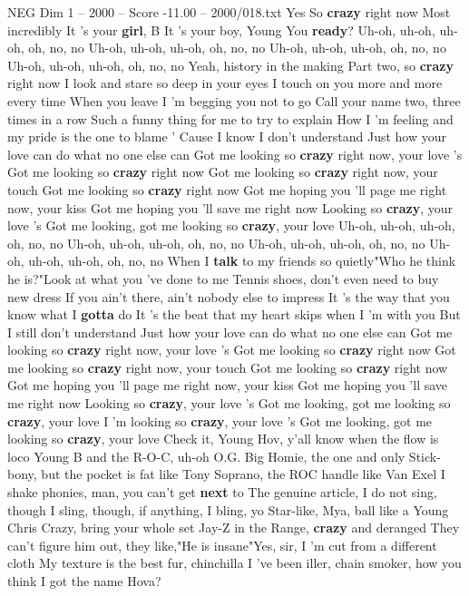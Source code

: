 \begin{textsample}{NEG Dim 1 – 2000 – Score -11.00 – 2000/018.txt}  \label{ex:f1_neg_003}
Yes So \textbf{crazy} right now Most incredibly It 's your \textbf{girl}, B It 's your boy, Young You \textbf{ready}?
Uh-oh, uh-oh, uh-oh, oh, no, no Uh-oh, uh-oh, uh-oh, oh, no, no Uh-oh, uh-oh, uh-oh, oh, no, no Uh-oh, uh-oh, uh-oh, oh, no, no Yeah, history in the making Part two, so \textbf{crazy} right now I look and stare so deep in your eyes I touch on you more and more every time When you leave I 'm begging you not to go Call your name two, three times in a row Such a funny thing for me to try to explain How I 'm feeling and my pride is the one to blame ' Cause I know I don't understand Just how your love can do what no one else can Got me looking so \textbf{crazy} right now, your love 's Got me looking so \textbf{crazy} right now Got me looking so \textbf{crazy} right now, your touch Got me looking so \textbf{crazy} right now Got me hoping you 'll page me right now, your kiss Got me hoping you 'll save me right now Looking so \textbf{crazy}, your love 's Got me looking, got me looking so \textbf{crazy}, your love Uh-oh, uh-oh, uh-oh, oh, no, no Uh-oh, uh-oh, uh-oh, oh, no, no Uh-oh, uh-oh, uh-oh, oh, no, no Uh-oh, uh-oh, uh-oh, oh, no, no When I \textbf{talk} to my friends so quietly"Who he think he is?"Look at what you 've done to me Tennis shoes, don't even need to buy new dress If you ain't there, ain't nobody else to impress It 's the way that you know what I \textbf{gotta} do It 's the beat that my heart skips when I 'm with you But I still don't understand Just how your love can do what no one else can Got me looking so \textbf{crazy} right now, your love 's Got me looking so \textbf{crazy} right now Got me looking so \textbf{crazy} right now, your touch Got me looking so \textbf{crazy} right now Got me hoping you 'll page me right now, your kiss Got me hoping you 'll save me right now Looking so \textbf{crazy}, your love 's Got me looking, got me looking so \textbf{crazy}, your love I 'm looking so \textbf{crazy}, your love 's Got me looking, got me looking so \textbf{crazy}, your love Check it, Young Hov, y'all know when the flow is loco Young B and the R-O-C, uh-oh O.G.
Big Homie, the one and only Stick-bony, but the pocket is fat like Tony Soprano, the ROC handle like Van Exel I shake phonies, man, you can't get \textbf{next} to The genuine article, I do not sing, though I sling, though, if anything, I bling, yo Star-like, Mya, ball like a Young Chris Crazy, bring your whole set Jay-Z in the Range, \textbf{crazy} and deranged They can't figure him out, they like,"He is insane"Yes, sir, I 'm cut from a different cloth My texture is the best fur, chinchilla I 've been iller, chain smoker, how you think I got the name Hova?

\end{textsample}
